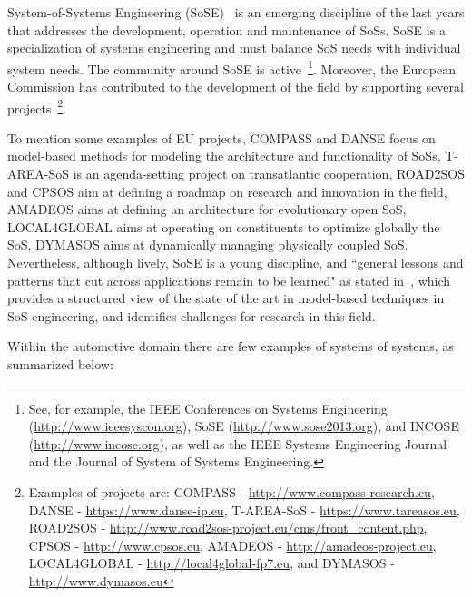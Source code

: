 System-of-Systems Engineering (SoSE)~\cite{Dahmann08} is an emerging discipline of the last years that addresses the development, operation and maintenance of SoSs. SoSE is a specialization of systems engineering and must balance SoS needs with individual system needs. The community around SoSE is active~\cite{Dahmann08}\footnote{See, for example, the IEEE Conferences on Systems Engineering (\url{http://www.ieeesyscon.org}), SoSE (\url{http://www.sose2013.org}), and INCOSE (\url{http://www.incose.org}), as well as the IEEE Systems Engineering Journal and the Journal of System of Systems Engineering.}. 
Moreover, the European Commission has contributed to the development of the field by supporting several projects~\cite{Ukil2011}\footnote{Examples of projects are:  COMPASS - \url{http://www.compass-research.eu}, 
DANSE - \url{https://www.danse-ip.eu}, 
T-AREA-SoS - \url{https://www.tareasos.eu}, 
ROAD2SOS - \url{http://www.road2sos-project.eu/cms/front_content.php}, 
CPSOS - \url{http://www.cpsos.eu},
AMADEOS - \url{http://amadeos-project.eu}, 
LOCAL4GLOBAL - \url{http://local4global-fp7.eu}, and 
DYMASOS - \url{http://www.dymasos.eu}}.  	

To mention some examples of EU projects, COMPASS and DANSE focus on model-based methods for modeling the architecture and functionality of SoSs, T-AREA-SoS is an agenda-setting project on transatlantic cooperation, ROAD2SOS and CPSOS aim at defining a roadmap on research and innovation in the field, AMADEOS aims at defining an architecture for evolutionary open SoS, LOCAL4GLOBAL aims at operating on constituents to optimize globally the SoS, DYMASOS aims at dynamically managing physically coupled SoS. 
Nevertheless, although lively, SoSE is a young discipline, and ``general lessons and patterns that cut across applications remain to be learned" as stated in~\cite{Dahmann08}, which provides a structured view of the state of the art in model-based techniques in SoS engineering, and identifies challenges for research in this field. 

Within the automotive domain there are few examples of systems of systems, as summarized below:

